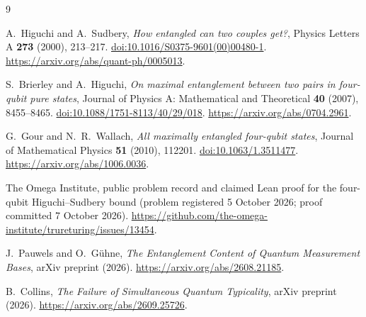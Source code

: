 \documentclass[11pt]{article}
\theoremstyle{definition}
\theoremstyle{remark}
\begin{document}
\begin{thebibliography}{9}

A.~Higuchi and A.~Sudbery,
\emph{How entangled can two couples get?},
Physics Letters A \textbf{273} (2000), 213--217.
\href{https://doi.org/10.1016/S0375-9601(00)00480-1}{doi:10.1016/S0375-9601(00)00480-1}.
\url{https://arxiv.org/abs/quant-ph/0005013}.

S.~Brierley and A.~Higuchi,
\emph{On maximal entanglement between two pairs in four-qubit pure states},
Journal of Physics A: Mathematical and Theoretical \textbf{40} (2007),
8455--8465.
\href{https://doi.org/10.1088/1751-8113/40/29/018}{doi:10.1088/1751-8113/40/29/018}.
\url{https://arxiv.org/abs/0704.2961}.

G.~Gour and N.~R.~Wallach,
\emph{All maximally entangled four-qubit states},
Journal of Mathematical Physics \textbf{51} (2010), 112201.
\href{https://doi.org/10.1063/1.3511477}{doi:10.1063/1.3511477}.
\url{https://arxiv.org/abs/1006.0036}.

The Omega Institute,
public problem record and claimed Lean proof for the four-qubit
Higuchi--Sudbery bound (problem registered 5 October 2026; proof committed
7 October 2026).
\url{https://github.com/the-omega-institute/trureturing/issues/13454}.

J.~Pauwels and O.~G\"uhne,
\emph{The Entanglement Content of Quantum Measurement Bases},
arXiv preprint (2026).
\url{https://arxiv.org/abs/2608.21185}.

B.~Collins,
\emph{The Failure of Simultaneous Quantum Typicality},
arXiv preprint (2026).
\url{https://arxiv.org/abs/2609.25726}.

\end{thebibliography}
\end{document}
